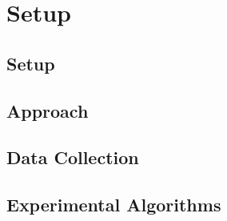 \chapter{Setup}\label{ch:setup}

\section{Setup}\label{sec:setup}


\section{Approach}\label{sec:approach}


\section{Data Collection}\label{sec:data-collection}


\section{Experimental Algorithms}\label{sec:experimental-algorithms}

